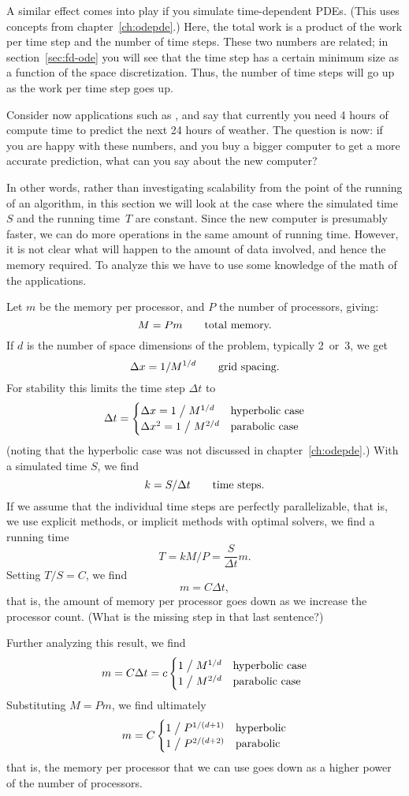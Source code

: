 A similar effect comes into play if you simulate time-dependent \acp{PDE}.
(This uses concepts from chapter~\ref{ch:odepde}.)
Here, the total work is a product of the work per time step and the number of 
time steps. These two numbers are related; in section~\ref{sec:fd-ode} you
will see that the time step has a certain minimum size as a function of the 
space discretization. Thus, the number of time steps will go up as the work per
time step goes up.

Consider now applications such as ,
and say that currently you need 4 hours of compute time
to predict the next 24 hours of weather.
The question is now: if you are happy with these numbers,
and you buy a bigger computer to get a more accurate prediction,
what can you say about the new computer?

In other words, 
rather than investigating scalability from the point of the running
of an algorithm, in this section we will look at the case where the simulated time~$S$
and the running time~$T$ are constant.
Since the new computer is presumably faster, we can do more operations
in the same amount of running time.
However, it is not clear what will happen to the amount of data involved,
and hence the memory required. To analyze this we have to
use some knowledge of the math of the applications.

Let $m$ be the memory per processor, and $P$ the number of processors, giving:
\[ M=Pm\qquad\hbox{total memory.} \]
If $d$ is the number of space dimensions of the problem, typically 2~or~3,
we get
\[ \Delta x = 1/M^{1/d}\qquad\hbox{grid spacing.} \]
For stability this limits the time step $\Delta t$ to
\[ \Delta t=
\begin{cases}
\Delta x=1\bigm/M^{1/d}&\hbox{hyperbolic case}\\
\Delta x^2=1\bigm/M^{2/d}&\hbox{parabolic case}
\end{cases}
\]
(noting that the hyperbolic case was not discussed in chapter~\ref{ch:odepde}.)
With a simulated time $S$, we find
\[ k=S/\Delta t\qquad \hbox{time steps.} \]
If we assume that the individual time steps are perfectly parallelizable,
that is, we use explicit methods, or implicit methods with optimal solvers,
we find a running time
\[ T=kM/P=\frac{S}{\Delta t}m. \]
Setting $T/S=C$, we find
\[ m=C\Delta t, \]
that is, the amount of memory per processor goes down as we increase the processor
count. (What is the missing step in that last sentence?)

Further analyzing this result, we find
\[ m=C\Delta t = c
\begin{cases}
1\bigm/M^{1/d}&\hbox{hyperbolic case}\\
1\bigm/M^{2/d}&\hbox{parabolic case}
\end{cases}
\]
Substituting $M=Pm$, we find ultimately
\[ m = C
\begin{cases}
1\bigm/P^{1/(d+1)}&\hbox{hyperbolic}\\
1\bigm/P^{2/(d+2)}&\hbox{parabolic}
\end{cases}
\]
that is, the memory per processor that we can use
goes down as a higher power of the number of processors.

